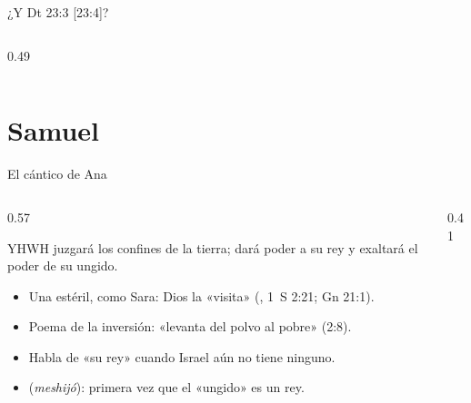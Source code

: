 \begin{frame}{¿Y Dt 23:3 [23:4]?}
\begin{columns}[T,onlytextwidth]
\begin{column}{0.49\textwidth}
\elabpropia
\end{column}
\end{columns}
\end{frame}

\section{Samuel}
\begin{frame}{El cántico de Ana}
\begin{columns}[c,onlytextwidth]
\begin{column}{0.57\textwidth}
\begin{cita}YHWH juzgará los confines de la tierra; dará poder a su rey y exaltará el poder de su ungido.\end{cita}
\scriptsize
\begin{itemize}
\item Una estéril, como Sara: Dios la «visita» (, 1~S 2:21; Gn 21:1).
\item Poema de la inversión: «levanta del polvo al pobre» (2:8).
\item Habla de «su rey» cuando Israel aún no tiene ninguno.
\item {} (\emph{meshijó}): primera vez que el «ungido» es un rey.
\end{itemize}
\end{column}
\begin{column}{0.41\textwidth}\end{column}
\end{columns}
\end{frame}

